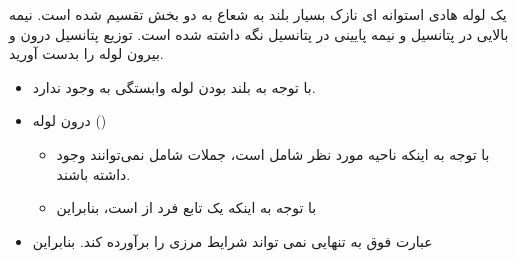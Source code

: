 \begin{ELexample}{}

یک لوله هادی استوانه ای نازک بسیار بلند به شعاع  به دو بخش تقسیم شده است. نیمه بالایی در پتانسیل  و نیمه پایینی در پتانسیل  نگه داشته شده است. توزیع پتانسیل درون و بیرون لوله را بدست آورید.


\begin{ELsolution}

\begin{itemize}
\tightlist
\item
  با توجه به بلند بودن لوله وابستگی به  وجود ندارد.
\end{itemize}


\begin{itemize}
\tightlist
\item
  درون لوله ()

  \begin{itemize}
  \tightlist
  \item
    با توجه به اینکه ناحیه مورد نظر شامل  است، جملات شامل  نمی‌توانند وجود داشته باشند.
  \item
    با توجه به اینکه  یک تابع فرد از \ELim{\phi} است، بنابراین
  \end{itemize}
\end{itemize}


\begin{itemize}
\tightlist
\item
  عبارت فوق به تنهایی نمی تواند شرایط مرزی را برآورده کند. بنابراین
\end{itemize}



\end{ELsolution}
\end{ELexample}
